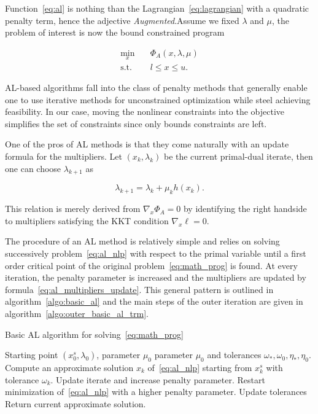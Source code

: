 \documentclass[10pt]{article}
\numberwithin{equation}{section}
\begin{document}
	 Function~\eqref{eq:al} is nothing than the Lagrangian~\eqref{eq:lagrangian} with a quadratic penalty term, hence the adjective \textit{Augmented}.Assume we fixed $\lambda$ and $\mu$, the problem of interest is now the bound constrained program
	 
	 \begin{equation}\label{eq:al_nlp}
	 	\begin{aligned}
	 		\min_x \quad & \Phi_A(x,\lambda,\mu) \\
	 		\text{s.t.} \quad & l \le x \le u.
	 	\end{aligned}
	 \end{equation}
	 
	 AL-based algorithms fall into the class of penalty methods that generally enable one to use iterative methods for unconstrained optimization  while steel achieving feasibility. In our case, moving the nonlinear constraints into the objective simplifies the set of constraints since only bounds constraints are left.
	 
	 One of the pros of AL methods is that they come naturally with an update formula for the multipliers. Let \((x_k,\lambda_k)\) be the current primal-dual iterate, then one can choose \(\lambda_{k+1} \) as
	 
	 \begin{equation}\label{eq:al_multipliers_update}
	 	\lambda_{k+1} = \lambda_k + \mu_kh(x_k).
	 \end{equation}
	 
	 This relation is merely derived from \(\nabla_x\Phi_A=0\) by identifying the right handside to multipliers satisfying the KKT condition \(\nabla_x \ell =0\).
	 
	 The procedure of an AL method is relatively simple and relies on solving successively  problem~\eqref{eq:al_nlp} with respect to the primal variable until a first order critical point of the original problem~\eqref{eq:math_prog} is found. At every iteration, the penalty parameter is increased and the multipliers are updated by formula~\eqref{eq:al_multipliers_update}. This general pattern is outlined in algorithm~\ref{algo:basic_al} and the main steps of the outer iteration are given in  algorithm~\ref{algo:outer_basic_al_trm}.
	 
	 	\begin{algorithm}
	 		\caption{Basic AL algorithm for solving~\eqref{eq:math_prog}}\label{algo:basic_al}
	 		\begin{algorithmic}
	 			\Require Starting point $\left(x_0^s,\lambda_0\right)$, parameter $\mu_0$  parameter $\mu_0$ and tolerances $\omega_*,\omega_0,\eta_*,\eta_0$.
	 			\Repeat
	 			 \State Compute an approximate solution $x_{k}$ of~\eqref{eq:al_nlp} starting from \(x_k^s\) with tolerance $\omega_k$.
	 				\State Update iterate and increase penalty parameter.
	 				\Else
	 					\State Restart minimization of~\eqref{eq:al_nlp} with a higher penalty parameter.
	 			\EndIf
	 			\State Update tolerances
	 			\State Return current approximate solution.
	 		\end{algorithmic}
	 	\end{algorithm}
	 	
\end{document}
